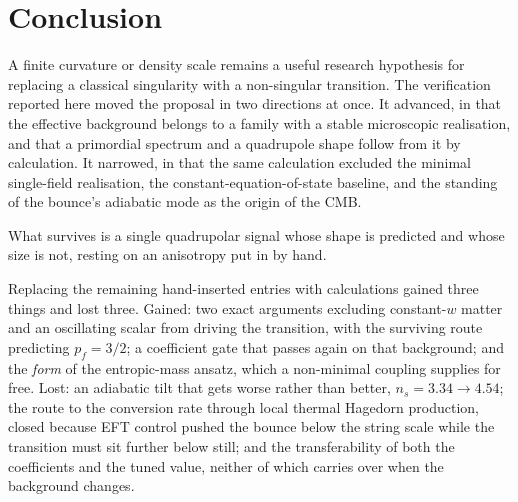 \documentclass[a4paper,11pt]{article}
\begin{document}
\section*{Conclusion}

A finite curvature or density scale remains a useful research hypothesis for replacing a classical singularity with a non-singular transition. The verification reported here moved the proposal in two directions at once. It advanced, in that the effective background belongs to a family with a stable microscopic realisation, and that a primordial spectrum and a quadrupole shape follow from it by calculation. It narrowed, in that the same calculation excluded the minimal single-field realisation, the constant-equation-of-state baseline, and the standing of the bounce's adiabatic mode as the origin of the CMB.

What survives is a single quadrupolar signal whose shape is predicted and whose size is not, resting on an anisotropy put in by hand.

Replacing the remaining hand-inserted entries with calculations gained three things and lost three. Gained: two exact arguments excluding constant-$w$ matter and an oscillating scalar from driving the transition, with the surviving route predicting $p_f=3/2$; a coefficient gate that passes again on that background; and the \emph{form} of the entropic-mass ansatz, which a non-minimal coupling supplies for free. Lost: an adiabatic tilt that gets worse rather than better, $n_s=3.34\to4.54$; the route to the conversion rate through local thermal Hagedorn production, closed because EFT control pushed the bounce below the string scale while the transition must sit further below still; and the transferability of both the coefficients and the tuned value, neither of which carries over when the background changes.
\end{document}

